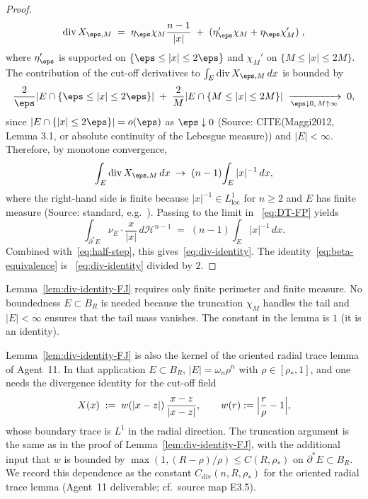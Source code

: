 \begin{proof}
\[
   \operatorname{div}X_{\eps,M}
   \;=\;\eta_\eps\chi_M\frac{n-1}{|x|}
       \;+\;(\eta_\eps'\chi_M+\eta_\eps\chi_M')\;,
\]
where $\eta_\eps'$ is supported on $\{\eps\le|x|\le 2\eps\}$ and
$\chi_M'$ on $\{M\le|x|\le 2M\}$. The contribution of the cut-off
derivatives to $\int_E\operatorname{div}X_{\eps,M}\,dx$ is bounded by
\[
   \frac{2}{\eps}|E\cap\{\eps\le|x|\le 2\eps\}|
   \;+\;\frac{2}{M}|E\cap\{M\le|x|\le 2M\}|
   \;\xrightarrow[\eps\downarrow 0,\,M\uparrow\infty]{}\;0,
\]
since $|E\cap\{|x|\le 2\eps\}|=o(\eps)$ as $\eps\downarrow 0$
(Source: CITE(Maggi2012, Lemma 3.1, or absolute continuity of the
Lebesgue measure)) and $|E|<\infty$. Therefore, by monotone
convergence,
\begin{equation}\label{eq:DT-limit}
   \int_E\operatorname{div}X_{\eps,M}\,dx
   \;\to\;(n-1)\!\int_E|x|^{-1}\,dx,
\end{equation}
where the right-hand side is finite because $|x|^{-1}\in L^1_{\mathrm{loc}}$
for $n\ge 2$ and $E$ has finite measure (Source: standard, e.g.\
\cite[Lemma 6.2]{Maggi2012}). Passing to the limit in~%
\eqref{eq:DT-FP} yields
\[
   \int_{\partial^*E}\nu_E\!\cdot\!\frac{x}{|x|}\,d\mathcal H^{n-1}
   \;=\;(n-1)\!\int_E|x|^{-1}\,dx.
\]
Combined with~\eqref{eq:half-step}, this gives~\eqref{eq:div-identity}.
The identity~\eqref{eq:beta-equivalence} is~%
\eqref{eq:div-identity} divided by $2$.
\end{proof}

\begin{remark}[Hypotheses]\label{rem:div-hypotheses}
Lemma~\ref{lem:div-identity-FJ} requires only finite perimeter and
finite measure. No boundedness $E\subset B_R$ is needed because the
truncation $\chi_M$ handles the tail and $|E|<\infty$ ensures that the
tail mass vanishes. The constant in the lemma is $1$
(it is an identity).
\end{remark}

\begin{remark}
\label{rem:div-bounded}
Lemma~\ref{lem:div-identity-FJ} is also the kernel of the oriented
radial trace lemma of Agent~11. In that application $E\subset B_R$,
$|E|=\omega_n\rho^n$ with $\rho\in[\rho_*,1]$, and one needs the
divergence identity for the cut-off field
\[
   X(x)\;:=\;w(|x-z|)\,\frac{x-z}{|x-z|},\qquad
   w(r):=\Bigl|\frac{r}{\rho}-1\Bigr|,
\]
whose boundary trace is $L^1$ in the radial direction. The truncation
argument is the same as in the proof of
Lemma~\ref{lem:div-identity-FJ}, with the additional input that
$w$ is bounded by $\max(1,(R-\rho)/\rho)\le C(R,\rho_*)$
on $\partial^*E\subset B_R$. We record this dependence as the
constant $C_{\mathrm{div}}(n,R,\rho_*)$ for the oriented radial trace
lemma (Agent~11 deliverable; cf.~source map E3.5).
\end{remark}

